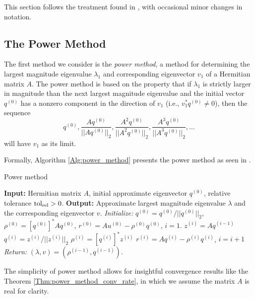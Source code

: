 This section follows the treatment found in \cite[Chapters 8, 10]{golub2012matrix}, with occasional minor changes in notation.





\subsection{The Power Method} 			\label{Subsubsec:evol_mats-power_method}


The first method we consider is the \textit{power method}, a method for determining the largest magnitude eigenvalue $\lambda_1$ and corresponding eigenvector $v_1$ of a Hermitian matrix $A$.  The power method is based on the property that if $\lambda_1$ is strictly larger in magnitude than the next largest magnitude eigenvalue and the initial vector $q^{(0)}$ has a nonzero component in the direction of $v_1$ (i.e., $v_1^*q^{(0)} \neq 0$), then the sequence
\[
q^{(0)}, \frac{Aq^{(0)}}{||Aq^{(0)}||_2},  \frac{A^2q^{(0)}}{||A^2q^{(0)}||_2},  \frac{A^3q^{(0)}}{||A^3q^{(0)}||_2}, \ldots
\]
will have $v_1$ as its limit.  

Formally, Algorithm \ref{Alg:power_method} presents the power method as seen in \cite[Section 8.2.1]{golub2012matrix}.

\begin{algorithm}[H]
\caption{Power method}	\label{Alg:power_method}

\begin{algorithmic}[1]
	\Statex 	\textbf{Input:} Hermitian matrix $A$, initial approximate eigenvector $q^{(0)}$, relative tolerance $\textnormal{tol}_\textnormal{rel} > 0$.
	\Statex 	\textbf{Output:} Approximate largest magnitude eigenvalue $\lambda$ and the corresponding eigenvector $v$.
	\State		\textit{Initialize:} $q^{(0)} = q^{(0)}/||q^{(0)}||_2$, $\rho^{(0)} = [q^{(0)}]^*Aq^{(0)}$, $r^{(0)} = Au^{(0)} - \rho^{(0)}q^{(0)}$, $i= 1$.
		\State		$z^{(i)} = Aq^{(i-1)}$
		\State		$q^{(i)} = z^{(i)} / ||z^{(i)}||_2$
		\State		$\rho^{(i)} = [q^{(i)}]^* z^{(i)}$
		\State		$r^{(i)} = Aq^{(i)} - \rho^{(i)}q^{(i)}$, $i = i + 1$
	\EndWhile
	\State		\textit{Return:} $(\lambda, v) = (\rho^{(i-1)} , q^{(i-1)})$.
\end{algorithmic}

\end{algorithm}


The simplicity of power method allows for insightful convergence results like the Theorem \ref{Thm:power_method_conv_rate}, in which we assume the matrix $A$ is real for clarity.

